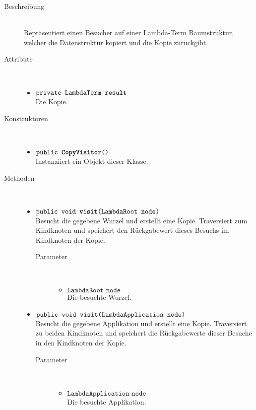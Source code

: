 \begin{description}
\item[Beschreibung] \hfill \\ Repräsentiert einen Besucher auf einer Lambda-Term Baumstruktur, welcher die Datenstruktur kopiert und die Kopie zurückgibt.

\item[Attribute] \hfill \\
	\vspace{-.8cm}
	\begin{itemize}
		\item $\texttt{private LambdaTerm \textbf{result}}$ \\ Die Kopie.
	\end{itemize}

\item[Konstruktoren] \hfill \\
	\vspace{-.8cm}
	\begin{itemize}
		\item $\texttt{public \textbf{CopyVisitor}()}$ \\ Instanziiert ein Objekt dieser Klasse.
	\end{itemize}

\item[Methoden] \hfill \\
	\vspace{-.8cm}
	\begin{itemize}
		\item $\texttt{public void \textbf{visit}(LambdaRoot node)}$ \\ Besucht die gegebene Wurzel und erstellt eine Kopie. Traversiert zum Kindknoten und speichert den Rückgabewert dieses Besuchs im Kindknoten der Kopie.
		\begin{description}
			\item[Parameter] \hfill \\
			\vspace{-.8cm}
			\begin{itemize}
				\item $\texttt{LambdaRoot node}$ \\ Die besuchte Wurzel.
			\end{itemize}
		\end{description}
				
		\item $\texttt{public void \textbf{visit}(LambdaApplication node)}$ \\ Besucht die gegebene Applikation und erstellt eine Kopie. Traversiert zu beiden Kindknoten und speichert die Rückgabewerte dieser Besuche in den Kindknoten der Kopie.
		\begin{description}
			\item[Parameter] \hfill \\
			\vspace{-.8cm}
			\begin{itemize}
				\item $\texttt{LambdaApplication node}$ \\ Die besuchte Applikation.
			\end{itemize}
		\end{description}
		

\end{itemize}
\end{description}
